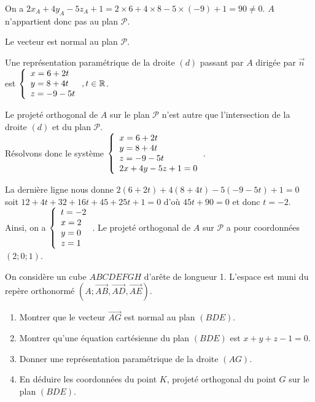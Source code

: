 \documentclass[11pt,fleqn, openany]{book} %
\begin{document}
\begin{solution}On a $2x_A+4y_A-5z_A+1=2 \times 6+4 \times 8-5 \times (-9)+1=90 \neq 0$. $A$ n'appartient donc pas au plan $\mathcal{P}$.

Le vecteur  est normal au plan $\mathcal{P}$.

Une représentation paramétrique de la droite $(d)$ passant par $A$ dirigée par $\vec n$ est $\left\{\renewcommand{\arraystretch}{1}\renewcommand{\arraystretch}{1}\begin{array}{l} x= 6+2t \\ y=8+4t \\z=-9-5t\end{array}\right.,t\in\mathbb{R}$.

Le projeté orthogonal de $A$ sur le plan $\mathcal{P}$ n'est autre que l'intersection de la droite $(d)$ et du plan $\mathcal{P}$. \\ Résolvons donc le système $\left\{\renewcommand{\arraystretch}{1}\renewcommand{\arraystretch}{1}\begin{array}{l} x= 6+2t \\ y=8+4t \\z=-9-5t \\ 2x+4y-5z+1=0\end{array}\right.$.

La dernière ligne nous donne $2(6+2t)+4(8+4t)-5(-9-5t)+1=0$ soit $12+4t+32+16t+45+25t+1=0$ d'où $45t+90=0$ et donc $t=-2$. Ainsi, on a $\left\{\renewcommand{\arraystretch}{1}\renewcommand{\arraystretch}{1}\begin{array}{l} t=-2 \\ x= 2 \\ y=0 \\z=1 \end{array}\right.$. Le projeté orthogonal de $A$ sur $\mathcal{P}$ a pour coordonnées $(2;0;1)$.\end{solution}



\begin{exercise}On considère un cube $ABCDEFGH$ d'arête de longueur 1. L'espace est muni du repère orthonormé $(A;\overrightarrow{AB},\overrightarrow{AD},\overrightarrow{AE})$. 

\begin{enumerate}
\item Montrer que le vecteur $\overrightarrow{AG}$ est normal au plan $(BDE)$.
\item Montrer qu'une équation cartésienne du plan $(BDE)$ est $x+y+z-1=0$.
\item Donner une représentation paramétrique de la droite $(AG)$.
\item En déduire les coordonnées du point $K$, projeté orthogonal du point $G$ sur le plan $(BDE)$.
\end{enumerate}\end{exercise}
\end{document}
